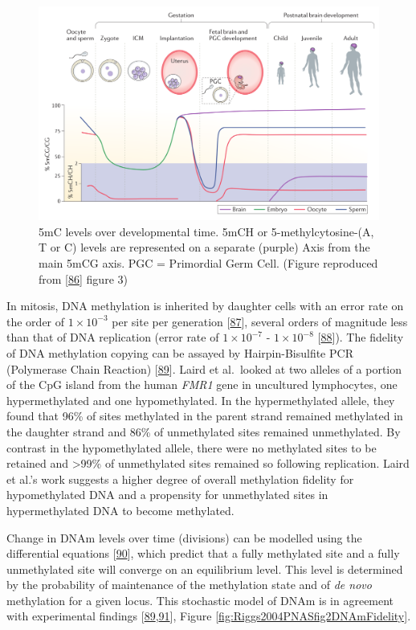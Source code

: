 \documentclass[
]{book}
\begin{document}
\begin{figure}

{\centering \includegraphics[width=0.8\linewidth]{figs/Ciernia2016f3DNAmTime} 

}

\caption{5mC levels over developmental time. 5mCH or 5-methylcytosine-(A, T or C) levels are represented on a separate (purple) Axis from the main 5mCG axis. PGC = Primordial Germ Cell. (Figure reproduced from {[}\protect\hyperlink{ref-Ciernia2016}{86}{]} figure 3)}\label{fig:DNAmDevTime}
\end{figure}



In mitosis, DNA methylation is inherited by daughter cells with an error rate on the order of \(1\times10^{-3}\) per site per generation {[}\protect\hyperlink{ref-Ushijima2005}{87}{]}, several orders of magnitude less than that of DNA replication (error rate of \(1\times10^{-7}\) - \(1\times10^{-8}\) {[}\protect\hyperlink{ref-Kunkel2004a}{88}{]}).
The fidelity of DNA methylation copying can be assayed by Hairpin-Bisulfite PCR (Polymerase Chain Reaction) {[}\protect\hyperlink{ref-Laird2004}{89}{]}.
Laird et al.~looked at two alleles of a portion of the CpG island from the human \emph{FMR1} gene in uncultured lymphocytes, one hypermethylated and one hypomethylated.
In the hypermethylated allele, they found that 96\% of sites methylated in the parent strand remained methylated in the daughter strand and 86\% of unmethylated sites remained unmethylated.
By contrast in the hypomethylated allele, there were no methylated sites to be retained and \textgreater99\% of unmethylated sites remained so following replication.
Laird et al.'s work suggests a higher degree of overall methylation fidelity for hypomethylated DNA and a propensity for unmethylated sites in hypermethylated DNA to become methylated.

Change in DNAm levels over time (divisions) can be modelled using the differential equations {[}\protect\hyperlink{ref-Pfeifer1990a}{90}{]}, which predict that a fully methylated site and a fully unmethylated site will converge on an equilibrium level.
This level is determined by the probability of maintenance of the methylation state and of \emph{de novo} methylation for a given locus.
This stochastic model of DNAm is in agreement with experimental findings {[}\protect\hyperlink{ref-Laird2004}{89},\protect\hyperlink{ref-Riggs2004a}{91}{]}, Figure \ref{fig:Riggs2004PNASfig2DNAmFidelity}.
\end{document}

